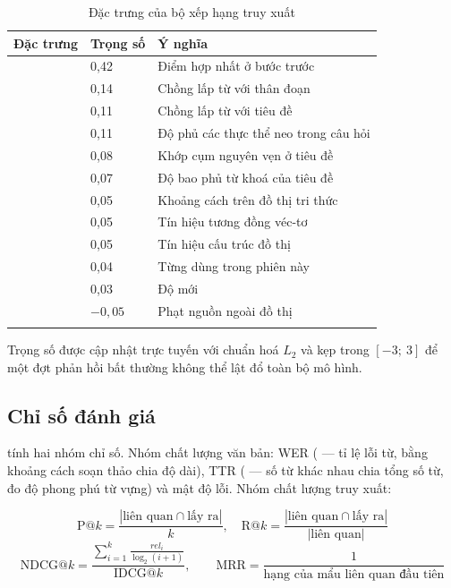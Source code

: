 \begin{longtable}{L{4.4cm} L{2.2cm} L{7.0cm}}
\toprule
\textbf{Đặc trưng} & \textbf{Trọng số} & \textbf{Ý nghĩa}\\
\midrule
\endhead
{} & 0,42 & Điểm hợp nhất ở bước trước\\
 & 0,14 & Chồng lấp từ với thân đoạn\\
 & 0,11 & Chồng lấp từ với tiêu đề\\
 & 0,11 & Độ phủ các thực thể neo trong câu hỏi\\
 & 0,08 & Khớp cụm nguyên vẹn ở tiêu đề\\
 & 0,07 & Độ bao phủ từ khoá của tiêu đề\\
 & 0,05 & Khoảng cách trên đồ thị tri thức\\
 & 0,05 & Tín hiệu tương đồng véc-tơ\\
 & 0,05 & Tín hiệu cấu trúc đồ thị\\
 & 0,04 & Từng dùng trong phiên này\\
 & 0,03 & Độ mới\\
 & \(-0{,}05\) & Phạt nguồn ngoài đồ thị\\
\bottomrule
\caption{Đặc trưng của bộ xếp hạng truy xuất}
\end{longtable}

Trọng số được cập nhật trực tuyến với chuẩn hoá \(L_2\) và kẹp trong \([-3;\ 3]\) để một
đợt phản hồi bất thường không thể lật đổ toàn bộ mô hình.

\subsection{Chỉ số đánh giá}

 tính hai nhóm chỉ số. Nhóm chất lượng văn bản: WER
( — tỉ lệ lỗi từ, bằng khoảng cách soạn thảo chia độ dài), TTR
( — số từ khác nhau chia tổng số từ, đo độ phong phú từ vựng) và mật
độ lỗi. Nhóm chất lượng truy xuất:

\begin{equation}
\mathrm{P@}k = \frac{|\text{liên quan} \cap \text{lấy ra}|}{k},\quad
\mathrm{R@}k = \frac{|\text{liên quan} \cap \text{lấy ra}|}{|\text{liên quan}|}
\end{equation}
\begin{equation}
\mathrm{NDCG@}k = \frac{\sum_{i=1}^{k} \frac{rel_i}{\log_2(i+1)}}{\mathrm{IDCG@}k},
\qquad
\mathrm{MRR} = \frac{1}{\text{hạng của mẩu liên quan đầu tiên}}
\end{equation}

